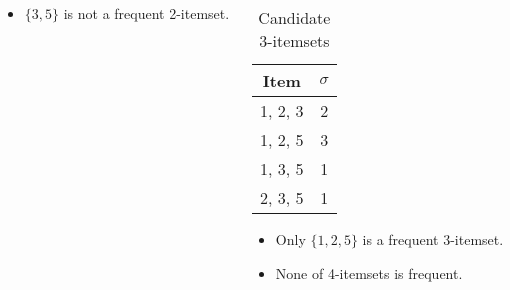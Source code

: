 \documentclass[aspectratio=169, 10pt]{beamer}
\begin{document}
\begin{frame}[t]
\begin{columns}
\begin{column}{0.5\textwidth}
        \begin{itemize}
            \item $\{3, 5\}$ is not a frequent 2-itemset.
        \end{itemize}
    \end{column}
    \begin{column}{0.5\textwidth} %
        \begin{table}[]
            \begin{tabular}{c|c}
                Item                           & $\sigma$            \\ \hline
                {\color[HTML]{FE0000} 1, 2, 3} & {\color[HTML]{FE0000} 2} \\
                1, 2, 5                        & 3                        \\
                {\color[HTML]{FE0000} 1, 3, 5} & {\color[HTML]{FE0000} 1} \\
                {\color[HTML]{FE0000} 2, 3, 5} & {\color[HTML]{FE0000} 1}
            \end{tabular}
            \caption{Candidate 3-itemsets}
        \end{table}

        \begin{itemize}
            \item Only $\{1, 2, 5\}$ is a frequent 3-itemset.
            \item None of 4-itemsets is frequent.
        \end{itemize}
    \end{column}
\end{columns}

\end{frame}
\end{document}
